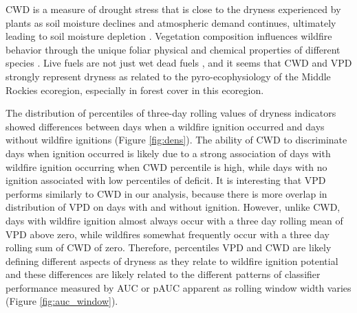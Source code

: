 \documentclass[11p]{article}
\begin{document}
CWD is a measure of drought stress that is close to the dryness experienced by plants as soil moisture declines and atmospheric demand continues, ultimately leading to soil moisture depletion \citep{stephensonActualEvapotranspirationDeficit1998}. Vegetation composition influences wildfire behavior through the unique foliar physical and chemical properties of different species \citep{mattjollySeasonalVariationsRed2016}. Live fuels are not just wet dead fuels \citep{jollyPyroEcophysiologyShiftingParadigm2018}, and it seems that CWD and VPD strongly represent dryness as related to the pyro-ecophysiology of the Middle Rockies ecoregion, especially in forest cover in this ecoregion.

The distribution of percentiles of three-day rolling values of dryness indicators showed differences between days when a wildfire ignition occurred and days without wildfire ignitions (Figure \ref{fig:dens}). The ability of CWD to discriminate days when ignition occurred is likely due to a strong association of days with wildfire ignition occurring when CWD percentile is high, while days with no ignition associated with low percentiles of deficit. It is interesting that VPD performs similarly to CWD in our analysis, because there is more overlap in distribution of VPD on days with and without ignition. However, unlike CWD, days with wildfire ignition almost always occur with a three day rolling mean of VPD above zero, while wildfires somewhat frequently occur with a three day rolling sum of CWD of zero. Therefore, percentiles VPD and CWD are likely defining different aspects of dryness as they relate to wildfire ignition potential and these differences are likely related to the different patterns of classifier performance measured by AUC or pAUC apparent as rolling window width varies (Figure \ref{fig:auc_window}).
\end{document}
